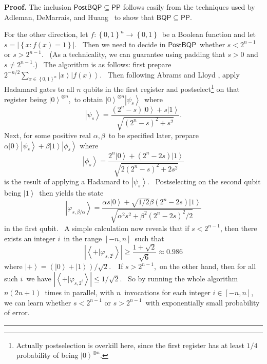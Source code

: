 \documentclass{article}%
\newenvironment{proof}[1][Proof]{\noindent\textbf{#1.} }{\ \rule{0.5em}{0.5em}}
\begin{document}
\begin{proof}
The inclusion $\mathsf{PostBQP}\subseteq\mathsf{PP}$ follows easily from the
techniques used by Adleman, DeMarrais, and Huang \cite{adh}\ to show that
$\mathsf{BQP}\subseteq\mathsf{PP}$.

For the other direction, let $f:\left\{  0,1\right\}  ^{n}\rightarrow\left\{
0,1\right\}  $\ be a Boolean function and let $s=\left\vert \left\{
x:f\left(  x\right)  =1\right\}  \right\vert $. \ Then we need to decide in
$\mathsf{PostBQP}$\ whether $s<2^{n-1}$ or $s>2^{n-1}$. \ (As a technicality,
we can guarantee using padding that $s>0$ and $s\neq2^{n-1}$.) \ The algorithm
is as follows: first prepare $2^{-n/2}\sum_{x\in\left\{  0,1\right\}  ^{n}%
}\left\vert x\right\rangle \left\vert f\left(  x\right)  \right\rangle $.
\ Then following Abrams and Lloyd \cite{al}, apply Hadamard gates to all $n$
qubits in the first register and postselect\footnote{Actually postselection is
overkill here, since the first register has at least $1/4$ probability of
being $\left\vert 0\right\rangle ^{\otimes n}$.} on that register being
$\left\vert 0\right\rangle ^{\otimes n}$,\ to obtain $\left\vert
0\right\rangle ^{\otimes n}\left\vert \psi_{s}\right\rangle $\ where%
\[
\left\vert \psi_{s}\right\rangle =\frac{\left(  2^{n}-s\right)  \left\vert
0\right\rangle +s\left\vert 1\right\rangle }{\sqrt{\left(  2^{n}-s\right)
^{2}+s^{2}}}.
\]
Next, for some positive real $\alpha,\beta$\ to be specified later, prepare
$\alpha\left\vert 0\right\rangle \left\vert \psi_{s}\right\rangle
+\beta\left\vert 1\right\rangle \left\vert \phi_{s}\right\rangle $ where
\[
\left\vert \phi_{s}\right\rangle =\frac{2^{n}\left\vert 0\right\rangle
+\left(  2^{n}-2s\right)  \left\vert 1\right\rangle }{\sqrt{2\left(
2^{n}-s\right)  ^{2}+2s^{2}}}%
\]
is the result of applying a Hadamard to $\left\vert \psi_{s}\right\rangle $.
\ Postselecting on the second qubit being $\left\vert 1\right\rangle $\ then
yields the state%
\[
\left\vert \varphi_{s,\beta/\alpha}\right\rangle =\frac{\alpha s\left\vert
0\right\rangle +\sqrt{1/2}\beta\left(  2^{n}-2s\right)  \left\vert
1\right\rangle }{\sqrt{\alpha^{2}s^{2}+\beta^{2}\left(  2^{n}-2s\right)
^{2}/2}}%
\]
in the first qubit. \ A simple calculation now reveals that if $s<2^{n-1}$,
then there exists an integer $i$\ in the range $\left[  -n,n\right]  $\ such
that%
\[
\left\vert \left\langle +|\varphi_{s,2^{i}}\right\rangle \right\vert
\geq\frac{1+\sqrt{2}}{\sqrt{6}}\approx0.986
\]
where $\left\vert +\right\rangle =\left(  \left\vert 0\right\rangle
+\left\vert 1\right\rangle \right)  /\sqrt{2}$.\ \ If $s>2^{n-1}$,\ on the
other hand, then for all such $i$\ we have $\left\vert \left\langle
+|\varphi_{s,2^{i}}\right\rangle \right\vert \leq1/\sqrt{2}$. \ So by running
the whole algorithm $n\left(  2n+1\right)  $\ times in parallel, with
$n$\ invocations for each integer $i\in\left[  -n,n\right]  $, we can learn
whether $s<2^{n-1}$ or $s>2^{n-1}$\ with exponentially small probability of error.
\end{proof}
\end{document}

